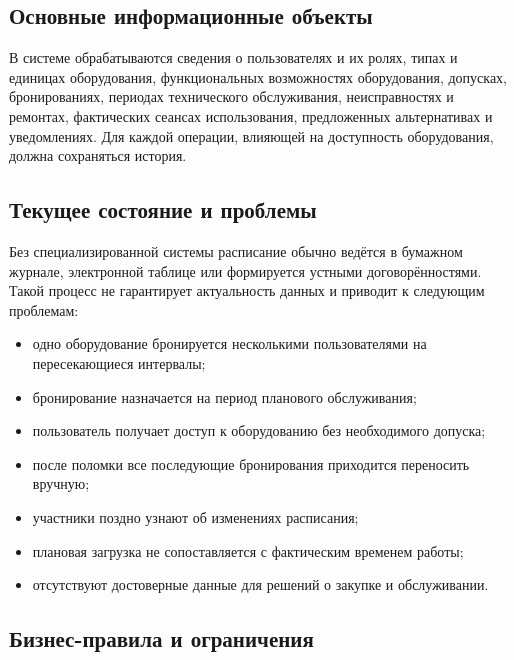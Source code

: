 \documentclass[12pt,a4paper]{article}
\begin{document}
\subsection{Основные информационные объекты}

В системе обрабатываются сведения о пользователях и их ролях, типах и единицах
оборудования, функциональных возможностях оборудования, допусках, бронированиях,
периодах технического обслуживания, неисправностях и ремонтах, фактических
сеансах использования, предложенных альтернативах и уведомлениях. Для каждой
операции, влияющей на доступность оборудования, должна сохраняться история.

\subsection{Текущее состояние и проблемы}

Без специализированной системы расписание обычно ведётся в бумажном журнале,
электронной таблице или формируется устными договорённостями. Такой процесс не
гарантирует актуальность данных и приводит к следующим проблемам:

\begin{itemize}
    \item одно оборудование бронируется несколькими пользователями на
    пересекающиеся интервалы;
    \item бронирование назначается на период планового обслуживания;
    \item пользователь получает доступ к оборудованию без необходимого допуска;
    \item после поломки все последующие бронирования приходится переносить
    вручную;
    \item участники поздно узнают об изменениях расписания;
    \item плановая загрузка не сопоставляется с фактическим временем работы;
    \item отсутствуют достоверные данные для решений о закупке и обслуживании.
\end{itemize}

\subsection{Бизнес-правила и ограничения}
\end{document}
